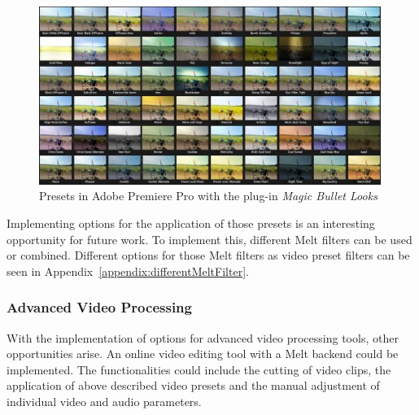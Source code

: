 \documentclass[../MasterThesis.tex]{subfiles}
\begin{document}
\begin{figure}[H]
	
	\centering
	
	\includegraphics[width=0.99\textwidth]{app.png}
	
	\caption[Presets in Adobe Premiere Pro (\textit{Magic Bullet Looks})]{Presets in Adobe Premiere Pro with the plug-in \textit{Magic Bullet Looks}~\cite{premierepro, magicbullet}}
	\label{figure:app}
	
\end{figure}

Implementing options for the application of those presets is an interesting opportunity for future work. To implement this, different Melt filters can be used or combined. Different options for those Melt filters as video preset filters can be seen in Appendix~\ref{appendix:differentMeltFilter}.













\subsubsection*{Advanced Video Processing}

With the implementation of options for advanced video processing tools, other opportunities arise. An online video editing tool with a Melt backend could be implemented. The functionalities could include the cutting of video clips, the application of above described video presets and the manual adjustment of individual video and audio parameters.
\end{document}
